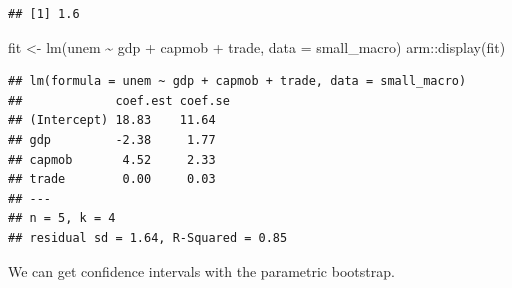 \documentclass[
]{book}
\newenvironment{Shaded}{\begin{snugshade}}{\end{snugshade}}
\newcommand{\AttributeTok}[1]{\textcolor[rgb]{0.77,0.63,0.00}{#1}}
\newcommand{\FunctionTok}[1]{\textcolor[rgb]{0.00,0.00,0.00}{#1}}
\newcommand{\NormalTok}[1]{#1}
\newcommand{\OtherTok}[1]{\textcolor[rgb]{0.56,0.35,0.01}{#1}}
\newcommand{\SpecialCharTok}[1]{\textcolor[rgb]{0.00,0.00,0.00}{#1}}
\begin{document}
\begin{verbatim}
## [1] 1.6
\end{verbatim}

\begin{Shaded}
\begin{Highlighting}[]
\NormalTok{fit }\OtherTok{\textless{}{-}} \FunctionTok{lm}\NormalTok{(unem }\SpecialCharTok{\textasciitilde{}}\NormalTok{ gdp }\SpecialCharTok{+}\NormalTok{ capmob }\SpecialCharTok{+}\NormalTok{ trade, }\AttributeTok{data =}\NormalTok{ small\_macro)}
\NormalTok{arm}\SpecialCharTok{::}\FunctionTok{display}\NormalTok{(fit)}
\end{Highlighting}
\end{Shaded}

\begin{verbatim}
## lm(formula = unem ~ gdp + capmob + trade, data = small_macro)
##             coef.est coef.se
## (Intercept) 18.83    11.64  
## gdp         -2.38     1.77  
## capmob       4.52     2.33  
## trade        0.00     0.03  
## ---
## n = 5, k = 4
## residual sd = 1.64, R-Squared = 0.85
\end{verbatim}

We can get confidence intervals with the parametric bootstrap.
\end{document}
